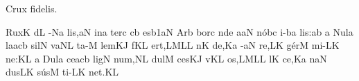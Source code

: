 \def\intralink#1{%
  \setbox\linkbox=\hbox{$\smile$}%
  \setbox\wordbox=\hbox{#1}%
  \setbox\linkbox=\hbox to\wd\wordbox{%
    \hss
    \lower\ht\linkbox\hbox{%
      \lower1pt\hbox{%
	\relax
	  \hbox{$\smile$}%
	}}%
    \hss}%
  \dp\linkbox=0pt
  \box\wordbox \llap{\box\linkbox}}


\beginhymn Crux fidelis.

\vskip-1mm

\Internote
\nosolesmescustos
\initiumgregorianum
{}%
\sgn Rux\punctum K\egn
\spatium
{}d\punctum L\egn
{}-\pes Na\egn
\sgn li{s,}\clivis aN\egn
\spatium
\sgn {}in\punctum a\egn
\sgn ter\ngl{}\punctum c\egn
\spatium
{}\clivis cb\egn
\sgn {}es\episem b1\clivis aN\egn
\spatium
\divisiominima
\spatium
\sgn {}Ar\punctum b\egn
\sgn bor\punctum c\egn
\spatium
{}n\pes de\egn
\sgn {}a{}\clivis aN\egn
\spatium
\sgn n{\'o}b\punctum c\egn
\sgn {}i-\clivis ba\egn
\sgn li{s:}\punctum a\augmentum b\egn
\spatium
\divisiomaior
\spatium
\custos a
\lineaproxima
\sgn N{u}l\punctum a\egn
\sgn la{}\torculus acb\egn
\spatium
\sgn s{i}l\punctum N\egn
\sgn va{}\clivis NL\egn
\spatium
\sgn t{a}-\punctum M\egn
\sgn lem\clivis KJ\egn
\spatium
{}f\pes KL\egn
\sgn {}e{rt,}\torculus LML\augmentum L\egn
\spatium
\divisiominima
\spatium
{}n\punctum K\egn
\sgn de,\pes Ka\egn
\spatium
{}-\clivis aN\egn
\sgn re,\clivis LK\egn
\spatium
\sgn g{\'e}r\punctum M\egn
\sgn mi-\clivis LK\egn
\sgn ne:\punctum K\augmentum L\egn
\spatium
\divisiomaior
\spatium
\custos a
\lineaproxima
\asteriscus
\spatium
\sgn D{u}l\punctum a\egn
\sgn ce{}\torculus acb\egn
\spatium
\sgn l{i}g\punctum N\egn
\sgn nu{m,}\clivis NL\egn
\spatium
\sgn d{u}l\punctum M\egn
\sgn ces\clivis KJ\egn
\spatium
{}v\pes KL\egn
\sgn {}o{s,}\torculus LML\augmentum L\egn
\spatium
\divisiominima
\spatium
{}l\punctum K\egn
\sgn ce,\pes Ka\egn
\spatium
{}n\clivis aN\egn
\sgn dus\clivis LK\egn
\spatium
\sgn s{\'u}s\punctum M\egn
\sgn ti-\clivis LK\egn
\sgn ne{t.}\punctum K\augmentum L\egn
\spatium
\Finisgregoriana

